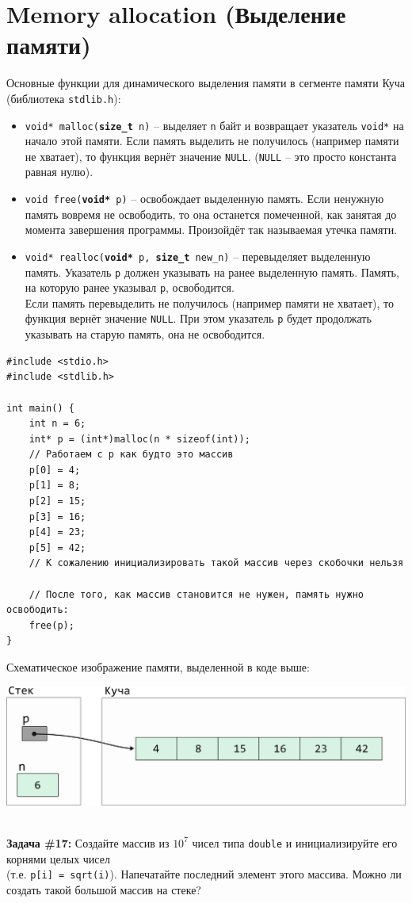 \documentclass{article}
\begin{document}
\section*{Memory allocation (Выделение памяти)}
Основные функции для динамического выделения памяти в сегменте памяти Куча (библиотека \texttt{stdlib.h}):
\begin{itemize}
\item \texttt{void* malloc(\textbf{size\_t} n)} -- выделяет \texttt{n} байт и возвращает указатель \texttt{void*}
на начало этой памяти. Если память выделить не получилось (например памяти не хватает), то функция вернёт значение \texttt{NULL}. (\texttt{NULL} -- это просто константа равная нулю). \\
\item \texttt{void free(\textbf{void*} p)} -- освобождает выделенную память. Если ненужную память вовремя не освободить, то она останется помеченной, как занятая до момента завершения программы. Произойдёт так называемая утечка памяти.\\
\item \texttt{void* realloc(\textbf{void*} p, \textbf{size\_t} new\_n)} -- перевыделяет выделенную память. Указатель \texttt{p} должен указывать на ранее выделенную память. Память, на которую ранее указывал \texttt{p}, освободится. \\
Если память перевыделить не получилось (например памяти не хватает), то функция вернёт значение \texttt{NULL}. При этом указатель \texttt{p} будет продолжать указывать на старую память, она не освободится.\\
\end{itemize}
\begin{lstlisting}
#include <stdio.h>
#include <stdlib.h>

int main() {
	int n = 6;
	int* p = (int*)malloc(n * sizeof(int)); 
	// Работаем с p как будто это массив
	p[0] = 4;
	p[1] = 8;
	p[2] = 15;
	p[3] = 16;
	p[4] = 23;
	p[5] = 42;
	// К сожалению инициализировать такой массив через скобочки нельзя
	
	// После того, как массив становится не нужен, память нужно освободить:
	free(p);
}
\end{lstlisting}
Схематическое изображение памяти, выделенной в коде выше:
\begin{center}
\includegraphics[scale=0.9]{../images/pointer_schemes/pointer_to_heap_array.png}
\end{center}
\quad\\
\textbf{Задача \#17:} Создайте массив из $10^7$ чисел типа \texttt{double} и инициализируйте его корнями
целых чисел\\ (т.е. \texttt{p[i] = sqrt(i)}). Напечатайте последний элемент этого массива. Можно ли 
создать такой большой массив на стеке?
\end{document}
